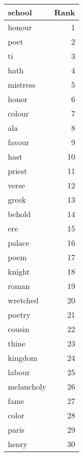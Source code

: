 \begin{table}
\label{tab:school_terms}
\begin{tabular}{lr}
\toprule
school & Rank \\
\midrule
honour & 1 \\
poet & 2 \\
ti & 3 \\
hath & 4 \\
mistress & 5 \\
honor & 6 \\
colour & 7 \\
ala & 8 \\
favour & 9 \\
hast & 10 \\
priest & 11 \\
verse & 12 \\
greek & 13 \\
behold & 14 \\
ere & 15 \\
palace & 16 \\
poem & 17 \\
knight & 18 \\
roman & 19 \\
wretched & 20 \\
poetry & 21 \\
cousin & 22 \\
thine & 23 \\
kingdom & 24 \\
labour & 25 \\
melancholy & 26 \\
fame & 27 \\
color & 28 \\
paris & 29 \\
henry & 30 \\
\bottomrule
\end{tabular}
\end{table}
